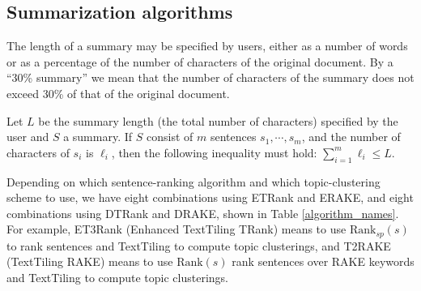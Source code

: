 \documentclass[a4paper,twoside]{article}
\begin{document}
\begin{comment}
Figure \ref{fig:fig3} shows the bipartite topical graph of TTCD, where $\bm{w}_j = (w_{1i}, \cdots, w_{k_j,j})$ is the vector words under topic $j$
($1 \leq j \leq m$), $s_z$ ($1 \leq z \leq n$) is a sentence in a document, $p_j$ ($1 \leq j \leq m$) is the product of possibilities in $wi$. $tz$ is the topic for the sentence $sz$ with the highest possibility. From equation \ref{topic}, we know that each sentence belongs to certain topic. Then we can use the basic TDCC to ensure the summary cover topics as many as possible.

 \begin{figure}[h]
\texttt{[image: fig3.png]}
\caption{Bipartite topical graph of TTCD}%
\label{fig:fig3}
\end{figure}
\end{comment}

\subsection{Summarization algorithms}
\label{ssect:sa}

The length of a summary may be specified by users,
either as a number of words or as a percentage of the number of characters of the original document.
By a ``30\% summary'' we mean that the number of characters of the summary does not exceed 30\% of that of the original document.

Let $L$ be the summary length (the total number of characters) specified by the user and $S$ a summary.
If $S$ consist of $m$ sentences
$s_1, \cdots, s_m$, and the number of characters of $s_i$ is $\ell_i$, then the following inequality must hold:
$\sum_{i=1}^m \ell_i \leq L.$

Depending on which sentence-ranking algorithm and which topic-clustering scheme to use, we have eight combinations
using ETRank and ERAKE, and eight combinations using DTRank and DRAKE, shown in Table \ref{algorithm_names}.
%
For example, ET3Rank (Enhanced TextTiling TRank) means to use $\mbox{Rank}_{sp}(s)$ to rank sentences and
TextTiling to compute topic clusterings, and
%
T2RAKE (TextTiling RAKE)
means to use $\mbox{Rank}(s)$ rank sentences over RAKE keywords and TextTiling
to compute topic clusterings. %
\end{document}
